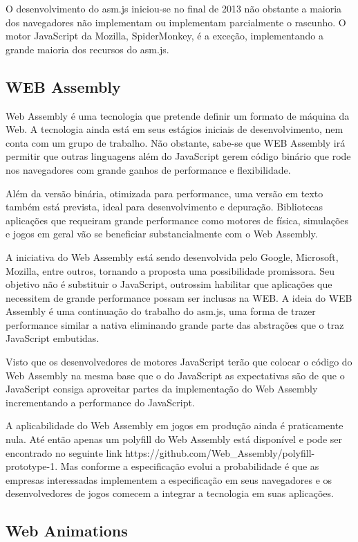 O desenvolvimento do asm.js iniciou-se no final de 2013 não obstante a
maioria dos navegadores não implementam ou implementam parcialmente o
rascunho. O motor JavaScript da Mozilla, SpiderMonkey, é a exceção,
implementando a grande maioria dos recursos do asm.js.

\subsection{WEB Assembly}
Web Assembly é uma tecnologia que pretende definir um formato de
máquina da Web. A tecnologia ainda está em seus estágios iniciais
de desenvolvimento, nem conta com um grupo de trabalho. Não obstante,
sabe-se que WEB Assembly irá permitir que outras linguagens além do
JavaScript gerem código binário que rode nos navegadores com grande
ganhos de performance e flexibilidade.

Além da versão binária, otimizada para performance, uma versão em
texto também está prevista, ideal para desenvolvimento e depuração.
Bibliotecas aplicações que requeiram grande performance como
motores de física, simulações e jogos em geral vão se beneficiar
substancialmente com o Web Assembly.

A iniciativa do Web Assembly está sendo desenvolvida pelo Google,
Microsoft, Mozilla, entre outros, tornando a proposta uma possibilidade
promissora. Seu objetivo não é substituir o JavaScript, outrossim
habilitar que aplicações que necessitem de grande performance possam
ser inclusas na WEB. A ideia do WEB Assembly é uma continuação
do trabalho do asm.js, uma forma de trazer performance similar a
nativa eliminando grande parte das abstrações que o traz JavaScript
embutidas.

Visto que os desenvolvedores de motores JavaScript terão que colocar
o código do Web Assembly na mesma base que o do JavaScript as
expectativas são de que o JavaScript consiga aproveitar partes
da implementação do Web Assembly incrementando a performance do
JavaScript.

A aplicabilidade do Web Assembly em jogos em produção ainda
é praticamente nula. Até então apenas um polyfill do Web
Assembly está disponível e pode ser encontrado no seguinte link
https://github.com/Web\_Assembly/polyfill-prototype-1. Mas conforme a
especificação evolui a probabilidade é que as empresas interessadas
implementem a especificação em seus navegadores e os desenvolvedores
de jogos comecem a integrar a tecnologia em suas aplicações.

\subsection{Web Animations}


